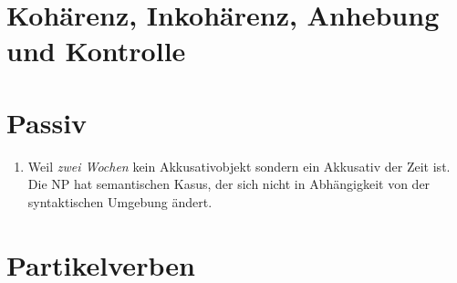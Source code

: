\section{Kohärenz, Inkohärenz, Anhebung und Kontrolle}


\eanoraggedright
{}
\z

\section{Passiv}

\begin{enumerate}
\item Weil \emph{zwei Wochen} kein Akkusativobjekt sondern ein Akkusativ der Zeit ist. Die NP hat
  semantischen Kasus, der sich nicht in Abhängigkeit von der syntaktischen Umgebung ändert.

\end{enumerate}


\section{Partikelverben}

